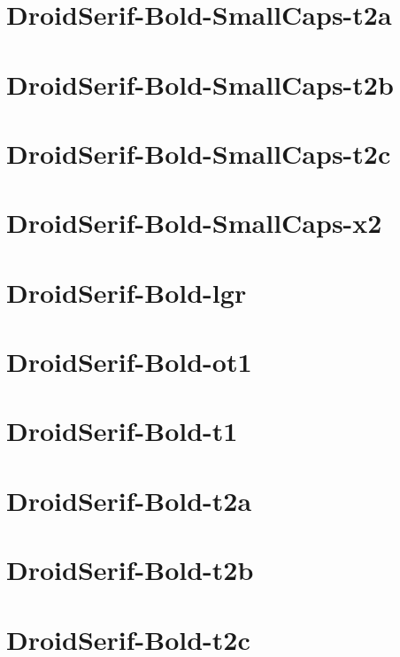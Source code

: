 \documentclass{article}
\begin{document}
\section{DroidSerif-Bold-SmallCaps-t2a}

\section{DroidSerif-Bold-SmallCaps-t2b}

\section{DroidSerif-Bold-SmallCaps-t2c}

\section{DroidSerif-Bold-SmallCaps-x2}

\section{DroidSerif-Bold-lgr}

\section{DroidSerif-Bold-ot1}

\section{DroidSerif-Bold-t1}

\section{DroidSerif-Bold-t2a}

\section{DroidSerif-Bold-t2b}

\section{DroidSerif-Bold-t2c}
\end{document}
